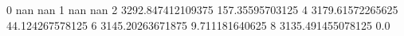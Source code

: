 0 nan nan
1 nan nan
2 3292.847412109375 157.35595703125
4 3179.61572265625 44.124267578125
6 3145.20263671875 9.711181640625
8 3135.491455078125 0.0
